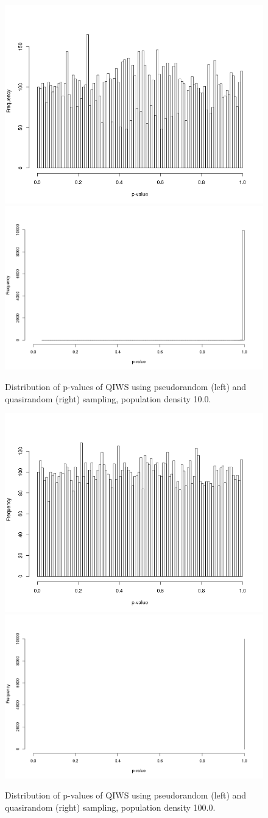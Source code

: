 \documentclass{JASSS}
\begin{document}
\begin{figure}[!t]
\centering
\includegraphics[width=0.498\linewidth]{figures/hist_pseudo_10} 
\includegraphics[width=0.498\linewidth]{figures/hist_quasi_10} 
\caption{Distribution of p-values of QIWS using pseudorandom (left) and quasirandom (right) sampling, population density 10.0.}
\label{fig:hist_sampling10}
\end{figure}

\begin{figure}[!t]
\centering
\includegraphics[width=0.498\linewidth]{figures/hist_pseudo_100} 
\includegraphics[width=0.498\linewidth]{figures/hist_quasi_100} 
\caption{Distribution of p-values of QIWS using pseudorandom (left) and quasirandom (right) sampling, population density 100.0.}
\label{fig:hist_sampling100}
\end{figure}
\end{document}
